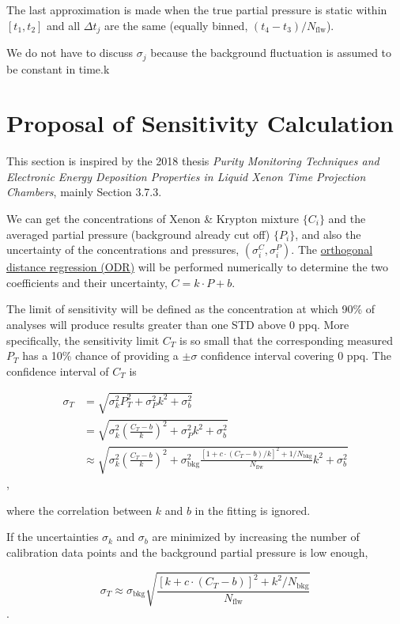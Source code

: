 \documentclass{article}
\begin{document}
The last approximation is made when the true partial pressure is static within $[t_1, t_2]$ and all $\Delta t_j$ are the same (equally binned, $(t_4 - t_3) / N_\mathrm{flw}$).

We do not have to discuss $\sigma_j$ because the background fluctuation is assumed to be constant in time.k

\section{Proposal of Sensitivity Calculation}

This section is inspired by the 2018 thesis \textit{Purity Monitoring Techniques and Electronic Energy Deposition Properties in Liquid Xenon Time Projection Chambers}, mainly Section 3.7.3.

We can get the concentrations of Xenon \& Krypton mixture $\{C_i\}$ and the averaged partial pressure (background already cut off) $\{P_i\}$, and also the uncertainty of the concentrations and pressures, $(\sigma_i^C, \sigma_i^P)$. The \href{https://www.mechanicalkern.com/static/odr_ams.pdf}{orthogonal distance regression (ODR)} will be performed numerically to determine the two coefficients and their uncertainty, $C = k\cdot P + b$.

The limit of sensitivity will be defined as the concentration at which 90\% of analyses will produce results greater than one STD above 0 ppq. More specifically, the sensitivity limit $C_T$ is so small that the corresponding measured $P_T$ has a 10\% chance of providing a $\pm\sigma$ confidence interval covering 0 ppq. The confidence interval of $C_T$ is

\begin{align}
    \sigma_T &= \sqrt{\sigma_k^2 P_T^2 + \sigma_P^2 k^2 + \sigma_b^2} \\
    &= \sqrt{\sigma_k^2 (\frac{C_T - b}{k})^2 + \sigma_P^2 k^2 + \sigma_b^2} \\
    &\approx \sqrt{\sigma_k^2 (\frac{C_T - b}{k})^2 + \sigma_\mathrm{bkg}^2\frac{[1 + c \cdot (C_T - b) / k]^2 + 1 / N_\mathrm{bkg}}{N_\mathrm{flw}} k^2 + \sigma_b^2}
\end{align},

where the correlation between $k$ and $b$ in the fitting is ignored.

If the uncertainties $\sigma_k$ and $\sigma_b$ are minimized by increasing the number of calibration data points and the background partial pressure is low enough,

\begin{equation}
    \sigma_T \approx \sigma_\mathrm{bkg}\sqrt{\frac{[k +  c \cdot (C_T - b)]^2 + k^2 / N_\mathrm{bkg}}{N_\mathrm{flw}}}
\end{equation}.
\end{document}
